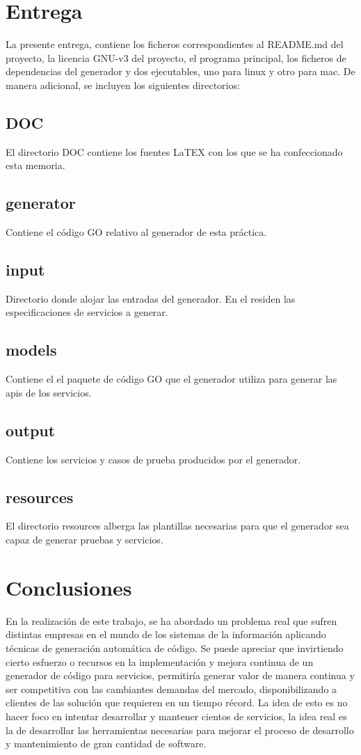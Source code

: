 \documentclass[a4paper,11pt]{book}
\begin{document}
\chapter{Entrega}
La presente entrega, contiene los ficheros correspondientes al README.md del proyecto, la licencia GNU-v3 del proyecto, el programa principal, los ficheros de dependencias del generador y dos ejecutables, uno para linux y otro para mac. De manera adicional, se incluyen los siguientes directorios:

\section{DOC}
El directorio DOC contiene los fuentes LaTEX con los que se ha confeccionado esta memoria. 
\section{generator}
Contiene el código GO relativo al generador de esta práctica. 
\section{input}
Directorio donde alojar las entradas del generador. En el residen las especificaciones de servicios a generar. 
 \section{models}
 Contiene el el paquete de código GO que el generador utiliza para generar las apis de los servicios. 
\section{output}
Contiene los servicios y casos de prueba producidos por el generador.  
\section{resources}
El directorio resources alberga las plantillas necesarias para que el generador sea capaz de generar pruebas y servicios. 
 
\chapter{Conclusiones}

En la realización de este trabajo, se ha abordado un problema real que sufren distintas empresas en el mundo de los sistemas de la información aplicando técnicas de generación automática de código. Se puede apreciar que invirtiendo cierto esfuerzo o recursos en la implementación y mejora continua de un generador de código para servicios, permitiría generar valor de manera continua y ser competitiva con las cambiantes demandas del mercado, disponibilizando a clientes de las solución que requieren en un tiempo récord. La idea de esto es no hacer foco en intentar desarrollar y mantener cientos de servicios, la idea real es la de desarrollar las herramientas necesarias para mejorar el proceso de desarrollo y mantenimiento de gran cantidad de software. 
\end{document}
